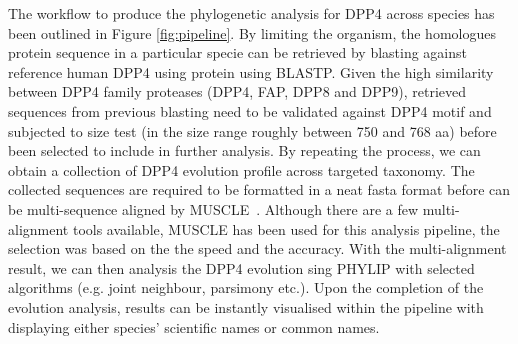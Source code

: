 The workflow to produce the phylogenetic analysis for DPP4 across species has been outlined in Figure \ref{fig:pipeline}. By limiting the organism, the homologues protein sequence in a particular specie can be retrieved by blasting against reference human DPP4 using protein using BLASTP. Given the high similarity between DPP4 family proteases (DPP4, FAP, DPP8 and DPP9), retrieved sequences from previous blasting need to be validated against DPP4 motif and subjected to size test (in the size range roughly between 750 and 768 aa) before been selected to include in further analysis. By repeating the process, we can obtain a collection of DPP4 evolution profile across targeted taxonomy. The collected sequences are required to be formatted in a neat fasta format before can be multi-sequence aligned by MUSCLE~\cite{15318951}. Although there are a few multi-alignment tools available, MUSCLE has been used for this analysis pipeline, the selection was based on the the speed and the accuracy. With the multi-alignment result, we can then analysis the DPP4 evolution sing PHYLIP with selected algorithms (e.g. joint neighbour, parsimony etc.). Upon the completion of the evolution analysis, results can be instantly visualised within the pipeline with displaying either species' scientific names or common names. \\

